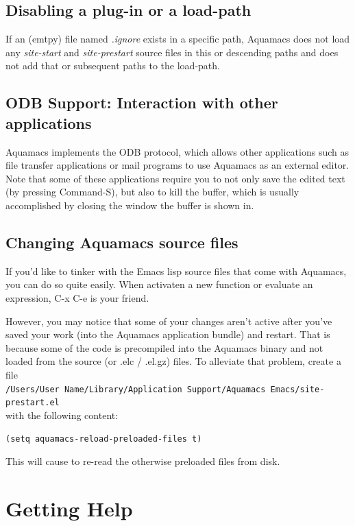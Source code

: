 \documentclass[11pt,letterpaper]{article}
\newcommand{\ttfile}{\tt}
\begin{document}
\subsection{Disabling a plug-in or a load-path}

If an (emtpy) file named \emph{.ignore} exists in a specific path, Aquamacs does not load any \emph
{site-start} and \emph{site-prestart} source files in this or descending paths and does not add that or 
subsequent paths to the load-path. 

\subsection{ODB Support: Interaction with other applications}

Aquamacs implements the ODB protocol, which allows other applications such as file transfer applications or mail programs to use Aquamacs as an external editor.  Note that some of these applications require you to not only save the edited text (by pressing Command-S), but also to kill the buffer, which is usually accomplished by closing the window the buffer is shown in.

\subsection{Changing Aquamacs source files}

If you'd like to tinker with the Emacs lisp source files that come with Aquamacs, you can do so quite easily. When activaten a new function or evaluate an expression, C-x C-e is your friend.

However, you may notice that some of your changes aren't active after you've saved your work (into the Aquamacs application bundle) and restart. That is because some of the code is precompiled into the Aquamacs binary and not loaded from the source (or .elc / .el.gz) files. To alleviate that problem, create a
file\\
{\ttfile /Users/User Name/Library/Application Support/Aquamacs Emacs/site-prestart.el} \\ with the following content:

\texttt{(setq aquamacs-reload-preloaded-files t)}

This will cause to re-read the otherwise preloaded files from disk.

\section{Getting Help}
\end{document}
